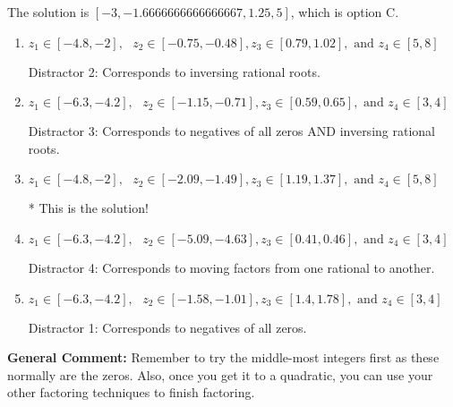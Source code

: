 \documentclass{extbook}[14pt]
\begin{document}
\begin{enumerate}
{The solution is \( [-3, -1.6666666666666667, 1.25, 5] \), which is option C.\begin{enumerate}[label=\Alph*.]
\item \( z_1 \in [-4.8, -2], \text{   }  z_2 \in [-0.75, -0.48], z_3 \in [0.79, 1.02], \text{   and   } z_4 \in [5, 8] \)

 Distractor 2: Corresponds to inversing rational roots.
\item \( z_1 \in [-6.3, -4.2], \text{   }  z_2 \in [-1.15, -0.71], z_3 \in [0.59, 0.65], \text{   and   } z_4 \in [3, 4] \)

 Distractor 3: Corresponds to negatives of all zeros AND inversing rational roots.
\item \( z_1 \in [-4.8, -2], \text{   }  z_2 \in [-2.09, -1.49], z_3 \in [1.19, 1.37], \text{   and   } z_4 \in [5, 8] \)

* This is the solution!
\item \( z_1 \in [-6.3, -4.2], \text{   }  z_2 \in [-5.09, -4.63], z_3 \in [0.41, 0.46], \text{   and   } z_4 \in [3, 4] \)

 Distractor 4: Corresponds to moving factors from one rational to another.
\item \( z_1 \in [-6.3, -4.2], \text{   }  z_2 \in [-1.58, -1.01], z_3 \in [1.4, 1.78], \text{   and   } z_4 \in [3, 4] \)

 Distractor 1: Corresponds to negatives of all zeros.
\end{enumerate}

\textbf{General Comment:} Remember to try the middle-most integers first as these normally are the zeros. Also, once you get it to a quadratic, you can use your other factoring techniques to finish factoring.
}
\end{enumerate}
\end{document}

